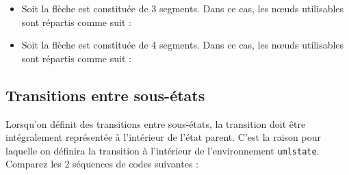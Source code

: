 \documentclass[a4paper,11pt]{report}
\newcommand{\inputTikZ}[1]{%
  }%
\newcommand{\inputTikZ}[1]{%
    \texttt{[image: fig/\#1.pdf]}%
  }%
\begin{document}
\medskip

\begin{itemize}
\item Soit la flèche est constituée de 3 segments. Dans ce cas, les n\oe{}uds utilisables sont répartis comme suit :

\begin{center}
\inputTikZ{figure57}
\end{center}

\item Soit la flèche est constituée de 4 segments. Dans ce cas, les n\oe{}uds utilisables sont répartis comme suit :

\medskip

\begin{center}
\inputTikZ{figure58}
\end{center}

\vspace{-4cm}

\end{itemize}

\subsection{Transitions entre sous-états}\label{ss.substatetrans}

Lorsqu'on définit des transitions entre sous-états, la transition doit être intégralement représentée à l'intérieur de l'état parent. C'est la raison pour laquelle on définira la transition à l'intérieur de l'environnement {\tt umlstate}. Comparez les 2 séquences de codes suivantes :

\medskip

\begin{minipage}{0.51\textwidth}

\end{minipage}
\begin{minipage}{0.49\textwidth}
\begin{center}
\inputTikZ{figure59}
\end{center}
\end{minipage}

\begin{minipage}{0.51\textwidth}

\end{minipage}
\begin{minipage}{0.49\textwidth}
\begin{center}
\inputTikZ{figure60}
\end{center}
\end{minipage}
\end{document}

